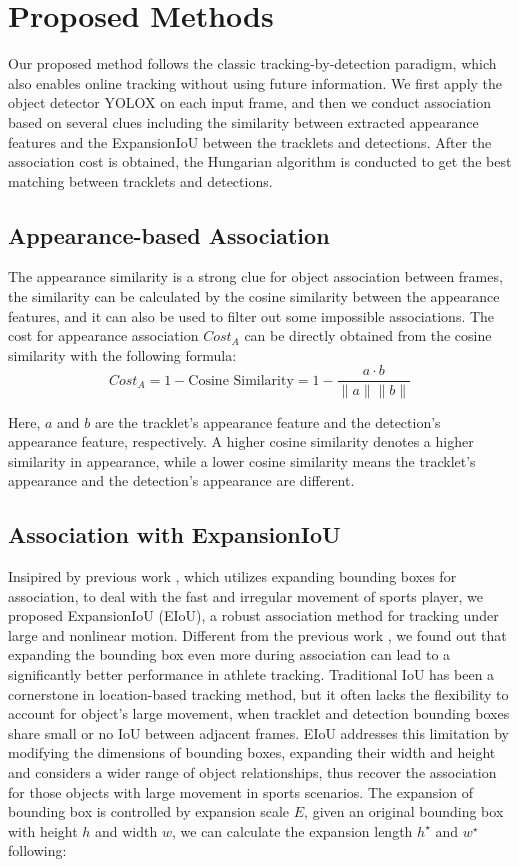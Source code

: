 \documentclass[10pt,twocolumn,letterpaper]{article}
\begin{document}
\section{Proposed Methods}
Our proposed method follows the classic tracking-by-detection paradigm, which also enables online tracking without using future information. We first apply the object detector YOLOX on each input frame, and then we conduct association based on several clues including the similarity between extracted appearance features and the ExpansionIoU between the tracklets and detections. After the association cost is obtained, the Hungarian algorithm is conducted to get the best matching between tracklets and detections.

\subsection{Appearance-based Association}
The appearance similarity is a strong clue for object association between frames, the similarity can be calculated by the cosine similarity between the appearance features, and it can also be used to filter out some impossible associations. The cost for appearance association $Cost_A$ can be directly obtained from the cosine similarity with the following formula:
\begin{equation}
Cost_A = 1 - \text{Cosine Similarity} = 1 - \frac{a \cdot b}{\lVert a \rVert \lVert b \rVert}
\end{equation}

Here, $a$ and $b$ are the tracklet's appearance feature and the detection's appearance feature, respectively. A higher cosine similarity denotes a higher similarity in appearance, while a lower cosine similarity means the tracklet's appearance and the detection's appearance are different.

\subsection{Association with ExpansionIoU}
Insipired by previous work \cite{yang2023hard}, which utilizes expanding bounding boxes for association, to deal with the fast and irregular movement of sports player, we proposed ExpansionIoU (EIoU), a robust association method for tracking under large and nonlinear motion.
Different from the previous work \cite{yang2023hard}, we found out that expanding the bounding box even more during association can lead to a significantly better performance in athlete tracking.
Traditional IoU has been a cornerstone in location-based tracking method, but it often lacks the flexibility to account for object's large movement, when tracklet and detection bounding boxes share small or no IoU between adjacent frames. EIoU addresses this limitation by modifying the dimensions of bounding boxes, expanding their width and height and considers a wider range of object relationships, thus recover the association for those objects with large movement in sports scenarios. 
The expansion of bounding box is controlled by expansion scale $E$, given an original bounding box with height $h$ and width $w$, we can calculate the expansion length $h^{\star}$ and $w^{\star}$ following:
\end{document}

